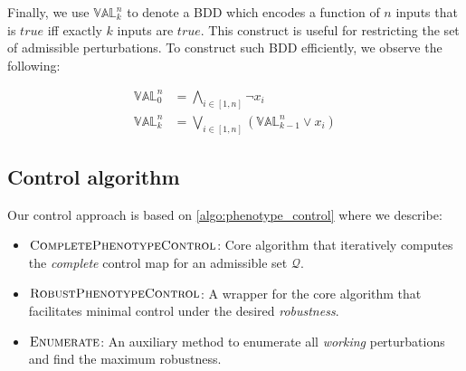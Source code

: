 

Finally, we use $\mathbb{VAL}_k^n$ to denote a BDD which encodes a function of $n$ inputs that is $\mathit{true}$ iff exactly $k$ inputs are $\mathit{true}$. This construct is useful for restricting the set of admissible perturbations. To construct such BDD efficiently, we observe the following: 

\begin{align*}
\mathbb{VAL}_0^n &= \bigwedge_{i \in [1,n]} \neg x_i \\
\mathbb{VAL}_k^n &= \bigvee_{i \in [1,n]} (\mathbb{VAL}_{k-1}^n \lor x_i) 
\end{align*}

\subsection{Control algorithm}
\label{sec:phen_ctrl_algo}

Our control approach is based on \autoref{algo:phenotype_control} where we describe:

\begin{itemize}
	\item $\textsc{CompletePhenotypeControl}$: Core algorithm that iteratively computes the \emph{complete} control map for an admissible set $\mathcal{Q}$.
	\item $\textsc{RobustPhenotypeControl}$: A wrapper for the core algorithm that facilitates minimal control under the desired \emph{robustness}.
	\item $\textsc{Enumerate}$: An auxiliary method to enumerate all \emph{working} perturbations and find the maximum robustness.
\end{itemize}


